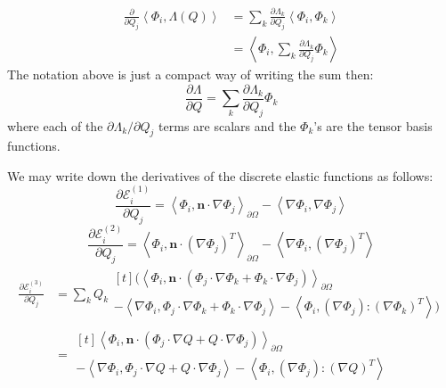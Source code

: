 \documentclass[reqno]{article}
\begin{document}
\begin{equation}
    \begin{split}
        \frac{\partial}{\partial Q_j} \left<\Phi_i, \Lambda(Q)\right>
        &= \sum_k \frac{\partial \Lambda_k}{\partial Q_j} \left<\Phi_i, \Phi_k\right> \\
        &= \left<\Phi_i, \sum_k \frac{\partial \Lambda_k}{\partial Q_j} \Phi_k\right>
    \end{split}
\end{equation}
The notation above is just a compact way of writing the sum then:
\begin{equation}
    \frac{\partial \Lambda}{\partial Q}
    =
    \sum_k \frac{\partial \Lambda_k}{\partial Q_j} \Phi_k
\end{equation}
where each of the $\partial \Lambda_k / \partial Q_j$ terms are scalars and the $\Phi_k$'s are the tensor basis functions.

We may write down the derivatives of the discrete elastic functions as follows:
\begin{equation}
    \frac{\partial \mathcal{E}^{(1)}_i}{\partial Q_j}
    =
    \left< \Phi_i, \mathbf{n} \cdot \nabla \Phi_j \right>_{\partial \Omega}
    - \left< \nabla \Phi_i, \nabla \Phi_j \right>
\end{equation}
\begin{equation}
    \frac{\partial \mathcal{E}^{(2)}_i}{\partial Q_j}
    =
    \left< \Phi_i, \mathbf{n} \cdot \left( \nabla \Phi_j \right)^T \right>_{\partial \Omega}
    - \left< \nabla \Phi_i, \left( \nabla \Phi_j \right)^T \right>
\end{equation}
\begin{equation}
    \begin{split}
    \frac{\partial \mathcal{E}^{(3)}_i}{\partial Q_j}
        &=
        \sum_k Q_k
            \begin{multlined}[t]
            \biggl(
            \left< \Phi_i, \mathbf{n} \cdot \left( \Phi_j \cdot \nabla \Phi_k + \Phi_k \cdot \nabla \Phi_j \right) \right>_{\partial \Omega} \\
            - \left< \nabla \Phi_i, \Phi_j \cdot \nabla \Phi_k + \Phi_k \cdot \nabla \Phi_j \right>
            - \left< \Phi_i, \left( \nabla \Phi_j \right) : \left( \nabla \Phi_k \right)^T \right>
            \biggr)
            \end{multlined}\\
        &= 
        \begin{multlined}[t]
            \left< \Phi_i, \mathbf{n} \cdot \left( \Phi_j \cdot \nabla Q + Q \cdot \nabla \Phi_j \right) \right>_{\partial \Omega} \\
        - \left< \nabla \Phi_i, \Phi_j \cdot \nabla Q + Q \cdot \nabla \Phi_j \right>
        - \left< \Phi_i, \left( \nabla \Phi_j \right) : \left( \nabla Q \right)^T \right>
        \end{multlined}
    \end{split}
\end{equation}
\end{document}
